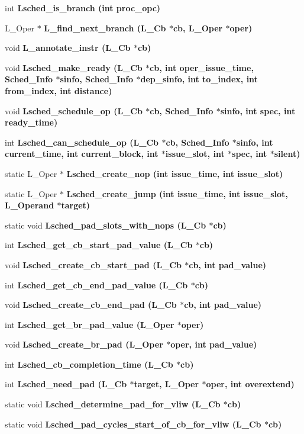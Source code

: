 \begin{CompactItemize}
int \bf{Lsched\_\-is\_\-branch} (int proc\_\-opc)
\item 
L\_\-Oper $\ast$ \bf{L\_\-find\_\-next\_\-branch} (L\_\-Cb $\ast$cb, L\_\-Oper $\ast$oper)
\item 
void \bf{L\_\-annotate\_\-instr} (L\_\-Cb $\ast$cb)
\item 
void \bf{Lsched\_\-make\_\-ready} (L\_\-Cb $\ast$cb, int oper\_\-issue\_\-time, \bf{Sched\_\-Info} $\ast$sinfo, \bf{Sched\_\-Info} $\ast$dep\_\-sinfo, int to\_\-index, int from\_\-index, int distance)
\item 
void \bf{Lsched\_\-schedule\_\-op} (L\_\-Cb $\ast$cb, \bf{Sched\_\-Info} $\ast$sinfo, int spec, int ready\_\-time)
\item 
int \bf{Lsched\_\-can\_\-schedule\_\-op} (L\_\-Cb $\ast$cb, \bf{Sched\_\-Info} $\ast$sinfo, int \bf{current\_\-time}, int current\_\-block, int $\ast$issue\_\-slot, int $\ast$spec, int $\ast$silent)
\item 
static L\_\-Oper $\ast$ \bf{Lsched\_\-create\_\-nop} (int issue\_\-time, int issue\_\-slot)
\item 
static L\_\-Oper $\ast$ \bf{Lsched\_\-create\_\-jump} (int issue\_\-time, int issue\_\-slot, L\_\-Operand $\ast$target)
\item 
static void \bf{Lsched\_\-pad\_\-slots\_\-with\_\-nops} (L\_\-Cb $\ast$cb)
\item 
int \bf{Lsched\_\-get\_\-cb\_\-start\_\-pad\_\-value} (L\_\-Cb $\ast$cb)
\item 
void \bf{Lsched\_\-create\_\-cb\_\-start\_\-pad} (L\_\-Cb $\ast$cb, int pad\_\-value)
\item 
int \bf{Lsched\_\-get\_\-cb\_\-end\_\-pad\_\-value} (L\_\-Cb $\ast$cb)
\item 
void \bf{Lsched\_\-create\_\-cb\_\-end\_\-pad} (L\_\-Cb $\ast$cb, int pad\_\-value)
\item 
int \bf{Lsched\_\-get\_\-br\_\-pad\_\-value} (L\_\-Oper $\ast$oper)
\item 
void \bf{Lsched\_\-create\_\-br\_\-pad} (L\_\-Oper $\ast$oper, int pad\_\-value)
\item 
int \bf{Lsched\_\-cb\_\-completion\_\-time} (L\_\-Cb $\ast$cb)
\item 
int \bf{Lsched\_\-need\_\-pad} (L\_\-Cb $\ast$target, L\_\-Oper $\ast$oper, int overextend)
\item 
static void \bf{Lsched\_\-determine\_\-pad\_\-for\_\-vliw} (L\_\-Cb $\ast$cb)
\item 
static void \bf{Lsched\_\-pad\_\-cycles\_\-start\_\-of\_\-cb\_\-for\_\-vliw} (L\_\-Cb $\ast$cb)

\end{CompactItemize}
